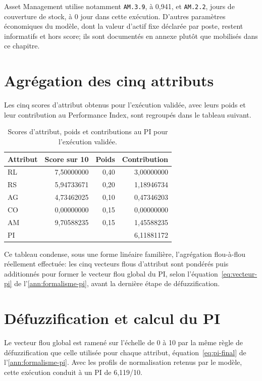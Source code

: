 Asset Management utilise notamment \texttt{AM.3.9}, à 0,941, et \texttt{AM.2.2}, jours de couverture de stock, à 0 jour dans cette exécution. D'autres paramètres économiques du modèle, dont la valeur d'actif fixe déclarée par poste, restent informatifs et hors score; ils sont documentés en annexe plutôt que mobilisés dans ce chapitre.

\section{Agrégation des cinq attributs}

Les cinq scores d'attribut obtenus pour l'exécution validée, avec leurs poids et leur contribution au Performance Index, sont regroupés dans le tableau suivant.

\begin{table}[H]
  \centering
  \begin{tabular}{@{}lrrr@{}}
    \toprule
    Attribut & Score sur 10 & Poids & Contribution \\
    \midrule
    RL & 7,50000000 & 0,40 & 3,00000000 \\
    RS & 5,94733671 & 0,20 & 1,18946734 \\
    AG & 4,73462025 & 0,10 & 0,47346203 \\
    CO & 0,00000000 & 0,15 & 0,00000000 \\
    AM & 9,70588235 & 0,15 & 1,45588235 \\
    \midrule
    PI & \multicolumn{3}{r}{6,11881172} \\
    \bottomrule
  \end{tabular}
  \caption{Scores d'attribut, poids et contributions au PI pour l'exécution validée.}
  \label{tab:scores-attributs-pi-doc}
\end{table}

Ce tableau condense, sous une forme linéaire familière, l'agrégation flou-à-flou réellement effectuée: les cinq vecteurs flous d'attribut sont pondérés puis additionnés pour former le vecteur flou global du PI, selon l'équation~\ref{eq:vecteur-pi} de l'\cref{ann:formalisme-pi}, avant la dernière étape de défuzzification.

\section{Défuzzification et calcul du PI}

Le vecteur flou global est ramené sur l'échelle de 0 à 10 par la même règle de défuzzification que celle utilisée pour chaque attribut, équation~\ref{eq:pi-final} de l'\cref{ann:formalisme-pi}. Avec les profils de normalisation retenus par le modèle, cette exécution conduit à un PI de 6,119/10.

